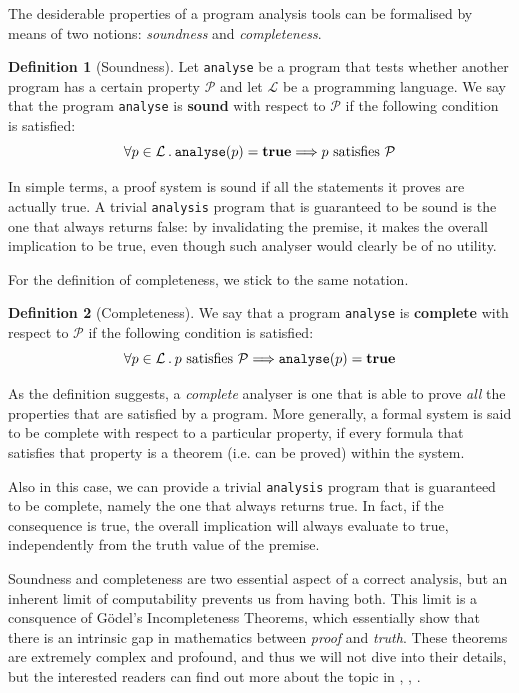 \documentclass[12pt,a4paper]{book}
\newcommand{\st}{\hspace{2px}.\hspace{2px}}
\theoremstyle{definition}
\newtheorem{defn}{Definition}
\begin{document}
	The desiderable properties of a program analysis tools can be formalised by means of two notions: \textit{soundness} and \textit{completeness}.
	
	\begin{defn}[Soundness]
		Let \texttt{analyse} be a program that tests whether another program has a certain property $\mathcal{P}$ and let $\mathcal{L}$ be a programming language. We say that the program \texttt{analyse} is \textbf{sound} with respect to $\mathcal{P}$ if the following condition is satisfied:
		\[
		\forall p \in \mathcal{L} \st \text{\texttt{analyse}}(p) = \text{\textbf{true}} \Longrightarrow p \text{ satisfies } \mathcal{P}
		\]
	\end{defn}
	In simple terms, a proof system is sound if all the statements it proves are actually true. A trivial \texttt{analysis} program that is guaranteed to be sound is the one that always returns false: by invalidating the premise, it makes the overall implication to be true, even though such analyser would clearly be of no utility.
	
	For the definition of completeness, we stick to the same notation.
	\begin{defn}[Completeness]
		We say that a program \texttt{analyse} is \textbf{complete} with respect to $\mathcal{P}$ if the following condition is satisfied:
		\[
		\forall p \in \mathcal{L} \st p \text{ satisfies } \mathcal{P} \Longrightarrow \text{\texttt{analyse}}(p) = \text{\textbf{true}} 
		\]
	\end{defn}
	As the definition suggests, a \textit{complete} analyser is one that is able to prove \textit{all} the properties that are satisfied by a program. More generally, a formal system is said to be complete with respect to a particular property, if every formula that satisfies that property is a theorem (i.e. can be proved) within the system.
	
	Also in this case, we can provide a trivial \texttt{analysis} program that is guaranteed to be complete, namely the one that always returns true. In fact, if the consequence is true, the overall implication will always evaluate to true, independently from the truth value of the premise.
	
	Soundness and completeness are two essential aspect of a correct analysis, but an inherent limit of computability prevents us from having both. This limit is a consquence of Gödel's Incompleteness Theorems, which essentially show that there is an intrinsic gap in mathematics between \textit{proof} and \textit{truth}. These theorems are extremely complex and profound, and thus we will not dive into their details, but the interested readers can find out more about the topic in \cite{Odifreddi1989}, \cite{Rogers1987}, \cite{Hinman2007}.
\end{document}
